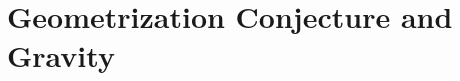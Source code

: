 \documentclass[12pt]{report}
\begin{document}
\section{Geometrization Conjecture and Gravity}










\end{document}
